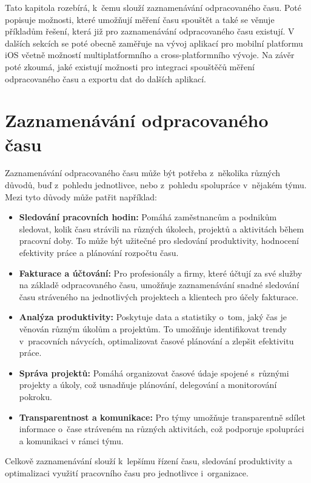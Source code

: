 Tato kapitola rozebírá, k~čemu slouží zaznamenávání odpracovaného času. Poté popisuje možnosti, které umožňují měření času spouštět a také se věnuje příkladům řešení, která již pro zaznamenávání odpracovaného času existují. V dalších sekcích se poté obecně zaměřuje na vývoj aplikací pro mobilní platformu iOS včetně možností multiplatformního a cross-platformního vývoje. Na závěr poté zkoumá, jaké existují možnosti pro integraci spouštěčů měření odpracovaného času a exportu dat do dalších aplikací.

\section{Zaznamenávání odpracovaného času}

Zaznamenávání odpracovaného času může být potřeba z~několika různých důvodů, buď z~pohledu jednotlivce, nebo z~pohledu spolupráce v~nějakém týmu. Mezi tyto důvody může patřit například:
\begin{itemize}
\item\textbf{Sledování pracovních hodin:} Pomáhá zaměstnancům a podnikům sledovat, kolik času strávili na různých úkolech, projektů a aktivitách během pracovní doby. To může být užitečné pro sledování produktivity, hodnocení efektivity práce a plánování rozpočtu času.
\item\textbf{Fakturace a účtování:} Pro profesionály a firmy, které účtují za své služby na základě odpracovaného času, umožňuje zaznamenávání snadné sledování času stráveného na jednotlivých projektech a klientech pro účely fakturace.
\item\textbf{Analýza produktivity:} Poskytuje data a statistiky o~tom, jaký čas je věnován různým úkolům a projektům. To umožňuje identifikovat trendy v~pracovních návycích, optimalizovat časové plánování a zlepšit efektivitu práce.
\item\textbf{Správa projektů:} Pomáhá organizovat časové údaje spojené s~různými projekty a úkoly, což usnadňuje plánování, delegování a monitorování pokroku.
\item\textbf{Transparentnost a komunikace:} Pro týmy umožňuje transparentně sdílet informace o~čase stráveném na různých aktivitách, což podporuje spolupráci a komunikaci v rámci týmu.
\end{itemize}

Celkově zaznamenávání slouží k~lepšímu řízení času, sledování produktivity a optimalizaci využití pracovního času pro jednotlivce i~organizace.

